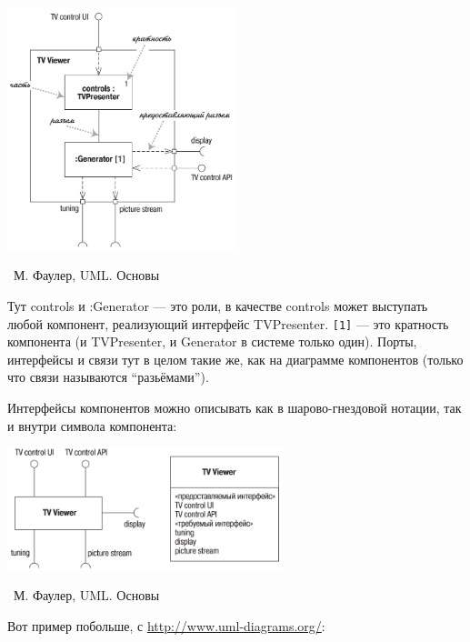 \documentclass[a5paper]{article}
\newcommand{\attribution}[1] {
    \vspace{-5mm}\begin{flushright}\begin{scriptsize}%
    {\textcopyright\, #1}\end{scriptsize}\end{flushright}
}
\begin{document}
\begin{center}
    \includegraphics[width=0.5\textwidth]{compositeStructureDiagram.png}
    \attribution{М. Фаулер, UML. Основы}
\end{center}

Тут controls и :Generator --- это роли, в качестве controls может выступать любой компонент, реализующий интерфейс TVPresenter. \verb|[1]| --- это кратность компонента (и TVPresenter, и Generator в системе только один). Порты, интерфейсы и связи тут в целом такие же, как на диаграмме компонентов (только что связи называются ``разьёмами'').

Интерфейсы компонентов можно описывать как в шарово-гнездовой нотации, так и внутри символа компонента:

\begin{center}
    \includegraphics[width=0.6\textwidth]{compositeStructureElement.png}
    \attribution{М. Фаулер, UML. Основы}
\end{center}

Вот пример побольше, с \url{http://www.uml-diagrams.org/}:
\end{document}
